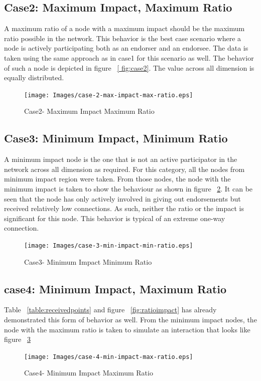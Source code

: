 \subsection{Case2: Maximum Impact, Maximum Ratio}
A maximum ratio of a node with a maximum impact should be the maximum ratio
possible in the network. This behavior is the best case scenario where a node
is actively participating both as an endorser and an endorsee. The data is
taken using the same approach as in case1 for this scenario as well. The
behavior of such a node is depicted in figure ~\ref{ fig:case2}. The value
across all dimension is equally distributed. 
\begin{figure}[h]
	\texttt{[image: Images/case-2-max-impact-max-ratio.eps]}
	\caption{Case2- Maximum Impact Maximum Ratio}
	\label{fig:case2}
\end{figure}
\subsection{Case3: Minimum Impact, Minimum Ratio}
A minimum impact node is the one that is not an active participator in the
network across all dimension as required. For this category, all the nodes from
minimum impact region were taken. From those nodes, the node with the minimum
impact is taken to show the behaviour as shown in figure ~\ref{fig:case3}. It
can be seen that the node has only actively involved in giving out endorsements
but received relatively low connections. As such, neither the ratio or the
impact is significant for this node. This behavior is typical of an extreme
one-way connection. 
\begin{figure}[h]
	\texttt{[image: Images/case-3-min-impact-min-ratio.eps]}
	\caption{Case3- Minimum Impact Minimum Ratio}
	\label{fig:case3}
\end{figure}
\subsection{case4: Minimum Impact, Maximum Ratio}
Table ~\ref{table:receivedpoints}  and figure ~\ref{fig:ratioimpact} has
already demonstrated this form of behavior as well. From the minimum impact
nodes, the node with the maximum ratio is taken to simulate an interaction that
looks like figure ~\ref{fig:case4}
\begin{figure}
	\texttt{[image: Images/case-4-min-impact-max-ratio.eps]}
	\caption{Case4- Minimum Impact Maximum Ratio}
	\label{fig:case4}
\end{figure}


